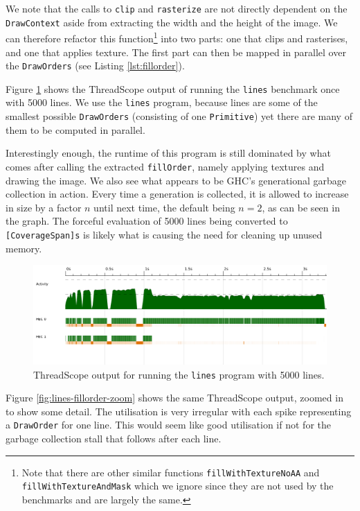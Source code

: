 \documentclass[12pt, a4paper]{article}
\begin{document}
We note that the calls to \texttt{clip} and \texttt{rasterize} are not directly dependent on the \texttt{DrawContext} aside from extracting the width and the height of the image. We can therefore refactor this function\footnote{Note that there are other similar functions \texttt{fillWithTextureNoAA} and \texttt{fillWithTextureAndMask} which we ignore since they are not used by the benchmarks and are largely the same.} into two parts: one that clips and rasterises, and one that applies texture. The first part can then be mapped in parallel over the \texttt{DrawOrders} (see Listing \ref{lst:fillorder}).

Figure \ref{fig:lines-fillorder} shows the ThreadScope output of running the \texttt{lines} benchmark once with 5000 lines. We use the \texttt{lines} program, because lines are some of the smallest possible \texttt{DrawOrders} (consisting of one \texttt{Primitive}) yet there are many of them to be computed in parallel.

Interestingly enough, the runtime of this program is still dominated by what comes after calling the extracted \texttt{fillOrder}, namely applying textures and drawing the image. We also see what appears to be GHC's generational garbage collection in action. Every time a generation is collected, it is allowed to increase in size by a factor $n$ until next time, the default being $n=2$, as can be seen in the graph. The forceful evaluation of 5000 lines being converted to \texttt{[CoverageSpan]s} is likely what is causing the need for cleaning up unused memory.

 \begin{figure}[H]
  \centering
  \includegraphics[width=\linewidth]{../threadscope/fillorder/lines}
  \caption{ThreadScope output for running the \texttt{lines} program with 5000 lines.}
  \label{fig:lines-fillorder}
\end{figure}

Figure \ref{fig:lines-fillorder-zoom} shows the same ThreadScope output, zoomed in to show some detail.
The utilisation is very irregular with each spike representing a \texttt{DrawOrder} for one line. This would seem like good utilisation if not for the garbage collection stall that follows after each line.
\end{document}
